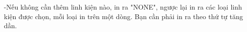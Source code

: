 -Nếu không cần thêm linh kiện nào, in ra "NONE", ngược lại in ra các loại linh kiện được chọn, mỗi loại in trên một dòng. Bạn cần phải in ra theo thứ tự tăng dần.  

\